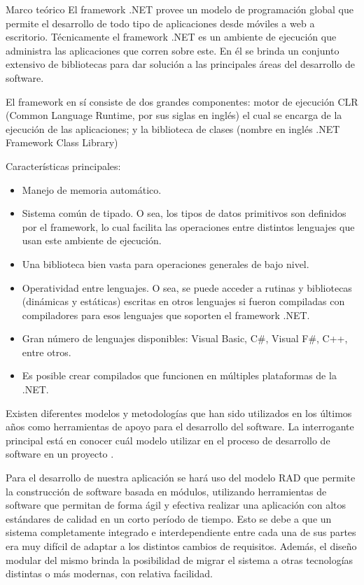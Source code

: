 \begin{thesischapter}{1} {Marco teórico}
    El framework .NET provee un modelo de programación global que permite el desarrollo de todo tipo de aplicaciones desde móviles a web a escritorio. Técnicamente el framework .NET es un ambiente de ejecución que administra las aplicaciones que corren sobre este. En él se brinda un conjunto extensivo de bibliotecas para dar solución a las principales áreas del desarrollo de software.

    El framework en sí consiste de dos grandes componentes: motor de ejecución CLR (Common Language Runtime, por sus siglas en inglés) el cual se encarga de la ejecución de las aplicaciones; y la biblioteca de clases (nombre en inglés .NET Framework Class Library)~\cite{netframework}

    \vspace{2pt}
    Características principales:
    \begin{itemize}
        \item Manejo de memoria automático.
        \item Sistema común de tipado. O sea, los tipos de datos primitivos son definidos por el framework, lo cual facilita las operaciones entre distintos lenguajes que usan este ambiente de ejecución.
        \item Una biblioteca bien vasta para operaciones generales de bajo nivel.
        \item Operatividad entre lenguajes. O sea, se puede acceder a rutinas y bibliotecas (dinámicas y estáticas) escritas en otros lenguajes si fueron compiladas con compiladores para esos lenguajes que soporten el framework .NET.
        \item Gran número de lenguajes disponibles: Visual Basic, C\#, Visual F\#, C++, entre otros.
        \item Es posible crear compilados que funcionen en múltiples plataformas de la .NET.
    \end{itemize}

    Existen diferentes modelos y metodologías que han sido utilizados en los últimos años como herramientas de apoyo para el desarrollo del software. La interrogante principal está en conocer cuál modelo utilizar en el proceso de desarrollo de software en un proyecto \cite{DELGADOOLIVERA2021}.
    
    \vspace{2pt}
    Para el desarrollo de nuestra aplicación se hará uso del modelo RAD que permite la construcción de software basada en módulos, utilizando herramientas de software que permitan de forma ágil y efectiva realizar una aplicación con altos estándares de calidad en un corto período de tiempo. Esto se debe a que un sistema completamente integrado e interdependiente entre cada una de sus partes era muy difícil de adaptar a los distintos cambios de requisitos. Además, el diseño modular del mismo brinda la posibilidad de migrar el sistema a otras tecnologías distintas o más modernas, con relativa facilidad.
    

\end{thesischapter}

